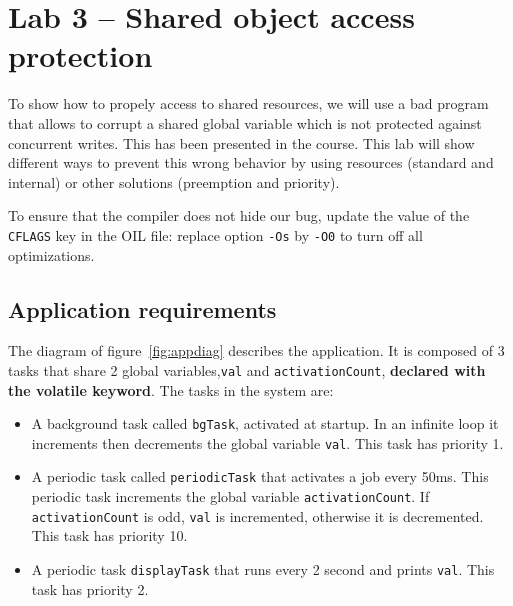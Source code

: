 \documentclass[11pt]{report}
\begin{document}
\chapter{Lab 3 -- Shared object access protection}

To show how to propely access to shared resources, we will use a bad program that allows to corrupt a shared global variable which is not protected against concurrent writes. This has been presented in the course. This lab will show different ways to prevent this wrong behavior by using resources (standard and internal) or other solutions (preemption and priority).

To ensure that the compiler does not hide our bug, update the value of the \texttt{CFLAGS} key in the OIL file: replace option \texttt{-Os} by \texttt{-O0} to turn off all optimizations.

\section{Application requirements}
\label{sec:sharedrez}


The diagram of figure~\ref{fig:appdiag} describes the application.
It is composed of 3 tasks that share 2 global variables,\texttt{val} and \texttt{activationCount}, {\bf declared with the volatile keyword}.
The tasks in the system are:
\begin{itemize}
  \item A background task called \texttt{bgTask}, activated at startup. In an infinite loop it increments then decrements the global variable \texttt{val}. This task has priority 1.
  \item A periodic task called \texttt{periodicTask} that activates a job every 50ms. This periodic task increments the global variable \texttt{activationCount}. If \texttt{activationCount} is odd, \texttt{val} is incremented, otherwise it is decremented. This task has priority 10.
  \item A periodic task \texttt{displayTask} that runs every 2 second and prints \texttt{val}. This task has priority 2.
\end{itemize}

\def\alarm#1#2{
  \node[alarm](#1) [#2] {};
  \coordinate (a) at ($(#1.north)$);
  \coordinate (b) at ($(#1.north east)$);
  \coordinate (c) at ($(#1.north west)$);
  \coordinate (d) at ($(#1)$);
  \draw[thick] ($(a)+(-0.1,0)$) rectangle ($(a)+(0.1,0.1)$);
  \draw[rotate=-45,thick] ($(b)+(-0.05,0)$) rectangle ($(b)+(0.05,0.1)$);
  \draw[rotate=45,thick] ($(c)+(-0.05,0)$) rectangle ($(c)+(0.05,0.1)$);
  \draw ($(d)+(0.3,0)$) -- (d) -- ($(d)+(0,0.3)$);
  \node [font=\scriptsize,below=0.5mm of #1] {{\em Alarm}}
}
\end{document}
